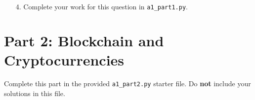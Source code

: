 \documentclass[11pt]{article}
\begin{document}
\begin{enumerate}
\item[4.]
Complete your work for this question in \texttt{a1\_part1.py}.

\end{enumerate}

\section*{Part 2: Blockchain and Cryptocurrencies}

Complete this part in the provided \texttt{a1\_part2.py} starter file.
Do \textbf{not} include your solutions in this file.
\end{document}
